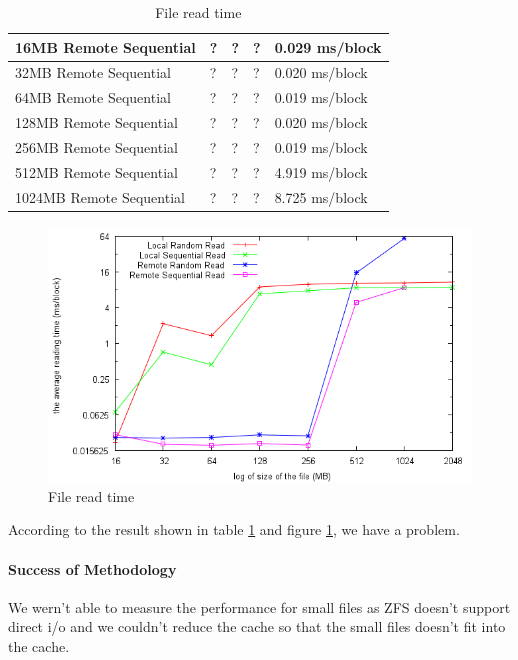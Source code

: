 \begin{table}[h]
\begin{center}
\begin{tabular}{| l | l | l | l | l |}
16MB Remote Sequential	& ?		& ?       & ?        & 0.029    ms/block \\ \hline
32MB Remote Sequential	& ?		& ?       & ?        & 0.020    ms/block \\ \hline
64MB Remote Sequential	& ?		& ?       & ?        & 0.019    ms/block \\ \hline
128MB Remote Sequential 	& ?		& ?       & ?        & 0.020    ms/block \\ \hline
256MB Remote Sequential	& ?		& ?       & ?        & 0.019    ms/block \\ \hline
512MB Remote Sequential	& ?		& ?       & ?        & 4.919    ms/block \\ \hline
1024MB Remote Sequential	& ?		& ?       & ?        & 8.725    ms/block \\ \hline\hline 
\hline
\end{tabular}
\end{center}
\caption{File read time\label{tab:file-read-time}}
\end{table}

\begin{figure}[h]
\begin{center}
\includegraphics[scale=0.8]{fileAccessImage}
\end{center}
\caption {File read time\label{fig:file-access}}
\end{figure}


According to the result shown in table \ref{tab:file-read-time} and figure
\ref{fig:file-access}, we have a problem.


\paragraph{Success of Methodology}
We wern't able to measure the performance for small files as ZFS doesn't support
direct i/o and we couldn't reduce the cache so that the small files doesn't fit
into the cache.




